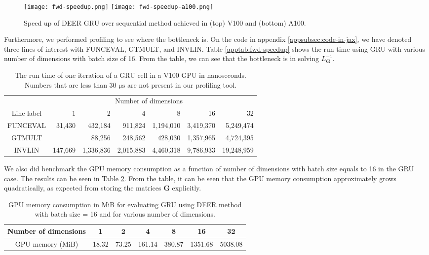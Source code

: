 \begin{figure}
    \centering
    \texttt{[image: fwd-speedup.png]}
    \texttt{[image: fwd-speedup-a100.png]}
    \caption{Speed up of DEER GRU over sequential method achieved in (top) V100 and (bottom) A100.}
    \label{appfig:V100-vs-A100-speed-up}
\end{figure}

Furthermore, we performed profiling to see where the bottleneck is.
On the code in appendix \ref{appsubsec:code-in-jax}, we have denoted three lines of interest with FUNCEVAL, GTMULT, and INVLIN.
Table \ref{apptab:fwd-speedup} shows the run time using GRU with various number of dimensions with batch size of 16.
From the table, we can see that the bottleneck is in solving $L_\mathbf{G}^{-1}$.

\begin{table}
    \centering
    \caption{The run time of one iteration of a GRU cell in a V100 GPU in nanoseconds.
    Numbers that are less than 30 $\mathrm{\mu s}$ are not present in our profiling tool. }
    \label{apptab:profiling}
    \begin{tabular}{|c|rrrrrr|}
        \hline
        ~ & ~ & \multicolumn{4}{c}{Number of dimensions} & ~ \\
        Line label & 1 & 2 & 4 & 8 & 16 & 32 \\
        \hline
        FUNCEVAL & 31,430 & 432,184 & 911,824 & 1,194,010 & 3,419,370 & 5,249,474 \\
        GTMULT & ~ & 88,256  &  248,562  &  428,030  & 1,357,965 & 4,724,395 \\
        INVLIN & 147,669 & 1,336,836 & 2,015,883 & 4,460,318 & 9,786,933 & 19,248,959 \\
        \hline
    \end{tabular}
\end{table}

We also did benchmark the GPU memory consumption as a function of number of dimensions with batch size equals to 16 in the GRU case.
The results can be seen in Table \ref{apptab:gpu-memory-consumption}.
From the table, it can be seen that the GPU memory consumption approximately grows quadratically, as expected from storing the matrices $\mathbf{G}$ explicitly.

\begin{table}[]
    \caption{GPU memory consumption in MiB for evaluating GRU using DEER method with batch size = 16 and for various number of dimensions.\\}
    \label{apptab:gpu-memory-consumption}
    \centering
    \begin{tabular}{c|cccccc}
        \hline
        Number of dimensions & 1 & 2 & 4 & 8 & 16 & 32 \\
        \hline
        GPU memory (MiB) & 18.32 & 73.25 & 161.14 & 380.87 & 1351.68 & 5038.08 \\
        \hline
    \end{tabular}
\end{table}